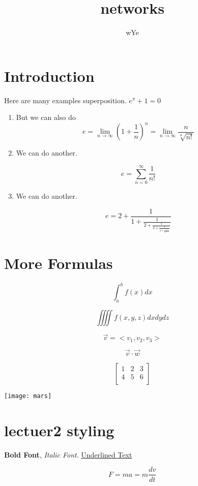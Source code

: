 \documentclass[a4paper, 11pt]{article}
\title{networks}
\author{wYe}
\begin{document}
    \maketitle

    \section*{Introduction}
    Here are many examples superposition.
    $e^{\pi}+ 1 = 0$

    \begin{enumerate} %
    \item 
    But we can also do
    $$
    e = \lim_{n \to \infty }\left(1+\frac{1}{n}\right)^n = \lim_{n \to \infty } \frac{n}{\sqrt[n]{n!}}
    $$

    \item We can do another.

    $$
    e = \sum_{n=0}^{\infty} \frac{1}{n!}
    $$

    \item     We can do another.

    $$
    e = 2 + \frac{1}{1+\frac{1}{2+\frac{1}{3+\frac{1}{4 + \frac{1}{5 + \ddots}}}}}
    $$
    \end{enumerate}

\section{More Formulas}
$$ \int_a^b f(x) dx $$

\[ \iiiint f(x, y, z) dxdydz \]

$$\vec{v}=<v_1, v_2, v_3> $$

$$ \vec{v} \cdot \vec{w} $$

$$\begin{bmatrix}
    1 & 2 & 3 \\
    4 & 5 & 6 \\
\end{bmatrix}$$

\texttt{[image: mars]}

\section{lectuer2 styling}

\textbf{Bold Font},
\textit{Italic Font}.
\underline{Underlined Text}

\begin{equation}
    \label{Force}
    F = ma 
    = m\frac{dv}{dt}
\end{equation}
\end{document}
